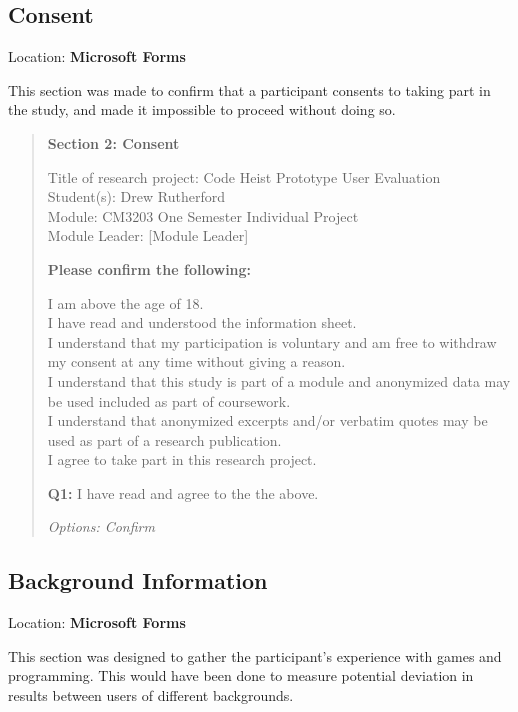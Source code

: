 \subsection{Consent}

Location: \textbf{Microsoft Forms}

This section was made to confirm that a participant consents to taking part in the study, and made it impossible to proceed without doing so.

\begin{fullwidth}
    \begin{quote}
        \textbf{Section 2: Consent}
    
        Title of research project: Code Heist Prototype User Evaluation \\
        Student(s): Drew Rutherford \\
        Module: CM3203 One Semester Individual Project \\
        Module Leader: [Module Leader]
        
        \textbf{Please confirm the following:}
        
        I am above the age of 18. \\
        I have read and understood the information sheet. \\
        I understand that my participation is voluntary and am free to withdraw my consent at any time without giving a reason. \\
        I understand that this study is part of a module and anonymized data may be used included as part of coursework. \\
        I understand that anonymized excerpts and/or verbatim quotes may be used as part of a research publication. \\
        I agree to take part in this research project.

        \textbf{Q1:} I have read and agree to the the above.

        \textit{Options: Confirm}
    \end{quote}
\end{fullwidth}

\subsection{Background Information}

Location: \textbf{Microsoft Forms}

This section was designed to gather the participant's experience with games and programming. This would have been done to measure potential deviation in results between users of different backgrounds.

